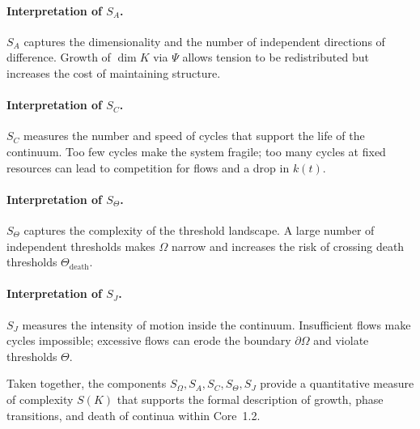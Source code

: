 \paragraph{Interpretation of \texorpdfstring{\(S_A\)}{S_A}.}
\(S_A\) captures the dimensionality and the number of independent directions of difference.
Growth of \(\dim K\) via \(\Psi\) allows tension to be redistributed but increases the cost of maintaining structure.

\paragraph{Interpretation of \texorpdfstring{\(S_C\)}{S_C}.}
\(S_C\) measures the number and speed of cycles that support the life of the continuum.
Too few cycles make the system fragile; too many cycles at fixed resources can lead to competition for flows and a drop in \(k(t)\).

\paragraph{Interpretation of \texorpdfstring{\(S_\Theta\)}{S_\Theta}.}
\(S_\Theta\) captures the complexity of the threshold landscape.
A large number of independent thresholds makes \(\Omega\) narrow and increases the risk of crossing death thresholds \(\Theta_{\mathrm{death}}\).

\paragraph{Interpretation of \texorpdfstring{\(S_J\)}{S_J}.}
\(S_J\) measures the intensity of motion inside the continuum.
Insufficient flows make cycles impossible; excessive flows can erode the boundary \(\partial\Omega\) and violate thresholds \(\Theta\).

Taken together, the components \(S_\Omega,S_A,S_C,S_\Theta,S_J\) provide a quantitative measure of complexity \(S(K)\) that supports the formal description of growth, phase transitions, and death of continua within Core~1.2.
